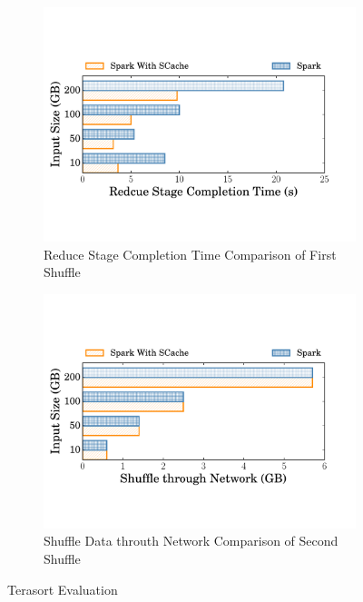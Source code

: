 
\begin{figure}
	\begin{subfigure}{\linewidth}
		\centering
		\includegraphics[width=0.92\linewidth]{fig/tera}
		\caption{Reduce Stage Completion Time Comparison of First Shuffle}
		\label{fig:terasort}
	\end{subfigure}
	\begin{subfigure}{\linewidth}
		\centering
		\includegraphics[width=0.92\linewidth]{fig/tera_shuffle}
		\caption{Shuffle Data throuth Network Comparison of Second Shuffle}
		\label{fig:terashuffle}
	\end{subfigure}
	\caption{Terasort Evaluation}
\end{figure}

